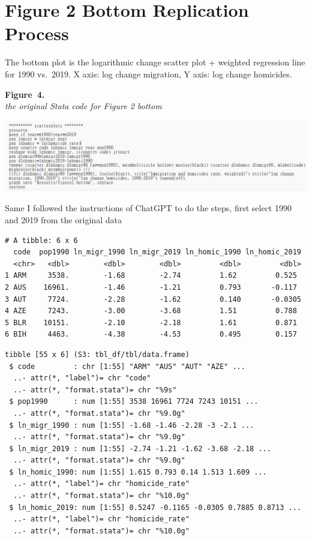 \documentclass[
  man,
  floatsintext,
  longtable,
  nolmodern,
  notxfonts,
  notimes,
  colorlinks=true,linkcolor=blue,citecolor=blue,urlcolor=blue]{apa7}
\begin{document}
\section{Figure 2 Bottom Replication
Process}\label{figure-2-bottom-replication-process}

The bottom plot is the logarithmic change scatter plot + weighted
regression line for 1990 vs.~2019. X axis: log change migration, Y axis:
log change homicides.

\label{fig:statabottom}
\textbf{Figure~4.}\\
\emph{the original Stata code for Figure 2 bottom}

\begin{center}
\includegraphics[width=0.8\linewidth,height=\textheight,keepaspectratio]{fig/statabottom.png}
\end{center}

Same I followed the instructions of ChatGPT to do the steps, first
select 1990 and 2019 from the original data

\begin{verbatim}
# A tibble: 6 x 6
  code  pop1990 ln_migr_1990 ln_migr_2019 ln_homic_1990 ln_homic_2019
  <chr>   <dbl>        <dbl>        <dbl>         <dbl>         <dbl>
1 ARM     3538.        -1.68        -2.74         1.62         0.525 
2 AUS    16961.        -1.46        -1.21         0.793       -0.117 
3 AUT     7724.        -2.28        -1.62         0.140       -0.0305
4 AZE     7243.        -3.00        -3.68         1.51         0.788 
5 BLR    10151.        -2.10        -2.18         1.61         0.871 
6 BIH     4463.        -4.38        -4.53         0.495        0.157 
\end{verbatim}

\begin{verbatim}
tibble [55 x 6] (S3: tbl_df/tbl/data.frame)
 $ code         : chr [1:55] "ARM" "AUS" "AUT" "AZE" ...
  ..- attr(*, "label")= chr "code"
  ..- attr(*, "format.stata")= chr "%9s"
 $ pop1990      : num [1:55] 3538 16961 7724 7243 10151 ...
  ..- attr(*, "format.stata")= chr "%9.0g"
 $ ln_migr_1990 : num [1:55] -1.68 -1.46 -2.28 -3 -2.1 ...
  ..- attr(*, "format.stata")= chr "%9.0g"
 $ ln_migr_2019 : num [1:55] -2.74 -1.21 -1.62 -3.68 -2.18 ...
  ..- attr(*, "format.stata")= chr "%9.0g"
 $ ln_homic_1990: num [1:55] 1.615 0.793 0.14 1.513 1.609 ...
  ..- attr(*, "label")= chr "homicide_rate"
  ..- attr(*, "format.stata")= chr "%10.0g"
 $ ln_homic_2019: num [1:55] 0.5247 -0.1165 -0.0305 0.7885 0.8713 ...
  ..- attr(*, "label")= chr "homicide_rate"
  ..- attr(*, "format.stata")= chr "%10.0g"
\end{verbatim}
\end{document}
